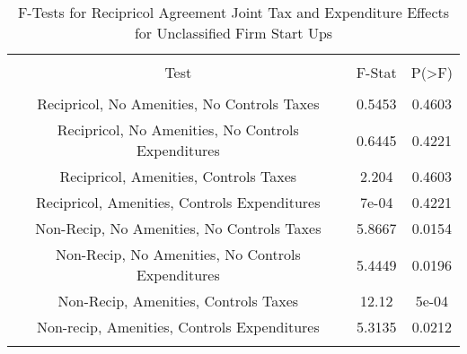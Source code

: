 
\begin{table}[!htbp] \centering 
  \caption{F-Tests for Recipricol Agreement Joint Tax and Expenditure Effects for Unclassified Firm Start Ups} 
  \label{99Ftests} 
\begin{tabular}{@{\extracolsep{5pt}} ccc} 
\\[-1.8ex]\hline 
\hline \\[-1.8ex] 
Test & F-Stat & P(\textgreater F) \\ 
\hline \\[-1.8ex] 
Recipricol, No Amenities, No Controls Taxes & 0.5453 & 0.4603 \\ 
Recipricol, No Amenities, No Controls Expenditures & 0.6445 & 0.4221 \\ 
Recipricol, Amenities, Controls Taxes & 2.204 & 0.4603 \\ 
Recipricol, Amenities, Controls Expenditures & 7e-04 & 0.4221 \\ 
Non-Recip, No Amenities, No Controls Taxes & 5.8667 & 0.0154 \\ 
Non-Recip, No Amenities, No Controls Expenditures & 5.4449 & 0.0196 \\ 
Non-Recip, Amenities, Controls Taxes & 12.12 & 5e-04 \\ 
Non-recip, Amenities, Controls Expenditures & 5.3135 & 0.0212 \\ 
\hline \\[-1.8ex] 
\end{tabular} 
\end{table} 
